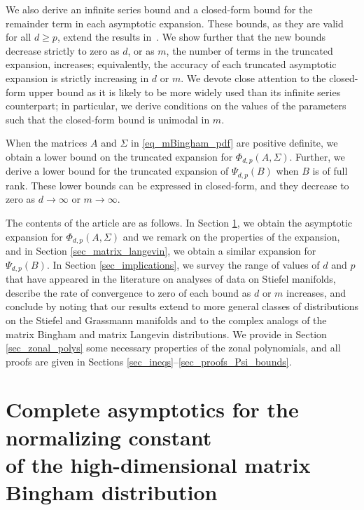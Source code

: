 \documentclass[pdftex]{sigma}
\numberwithin{equation}{section}
\begin{document}
We also derive an infinite series bound and a closed-form bound for the remainder term in each asymptotic expansion. These bounds, as they are valid for all $d \ge p$, extend the results in~\cite{BagyanRichards}. We show further that the new bounds decrease strictly to zero as $d$, or as $m$, the number of terms in the truncated expansion, increases; equivalently, the accuracy of each truncated asymptotic expansion is strictly increasing in $d$ or $m$. We devote close attention to the closed-form upper bound as it is likely to be more widely used than its infinite series counterpart; in particular, we derive conditions on the values of the parameters such that the closed-form bound is unimodal in $m$.

When the matrices $A$ and $\Sigma$ in \eqref{eq_mBingham_pdf} are positive definite, we obtain a lower bound on the truncated expansion for $\Phi_{d,p}(A,\Sigma)$. Further, we derive a lower bound for the truncated expansion of $\Psi_{d,p}(B)$ when $B$ is of full rank. These lower bounds can be expressed in closed-form, and they decrease to zero as $d \to \infty$ or $m \to \infty$.

The contents of the article are as follows. In Section \ref{sec_matrix_bingham}, we obtain the asymptotic expansion for $\Phi_{d,p}(A,\Sigma)$ and we remark on the properties of the expansion, and in Section \ref{sec_matrix_langevin}, we obtain a similar expansion for $\Psi_{d,p}(B)$. In Section \ref{sec_implications}, we survey the range of values of $d$ and $p$ that have appeared in the literature on analyses of data on Stiefel manifolds, describe the rate of convergence to zero of each bound as $d$ or $m$ increases, and conclude by noting that our results extend to more general classes of distributions on the Stiefel and Grassmann manifolds and to the complex analogs of the matrix Bingham and matrix Langevin distributions. We provide in Section \ref{sec_zonal_polys} some necessary properties of the zonal polynomials, and all proofs are given in Sections \ref{sec_ineqs}--\ref{sec_proofs_Psi_bounds}.


\section[Complete asymptotics for the normalizing constant of the high-dimensional matrix Bingham distribution]{Complete asymptotics for the normalizing constant\\ of the high-dimensional matrix Bingham distribution}
\label{sec_matrix_bingham}
\end{document}
